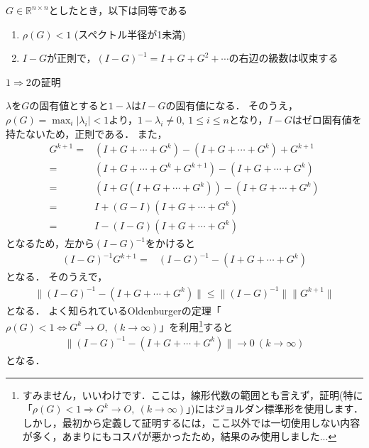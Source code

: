\begin{Thm}\label{thm:finite_Neumann}
	$G \in {\mathbb R}^{n \times n}$としたとき，以下は同等である
	\begin{enumerate}
		\item $\rho(G) < 1$ (スペクトル半径が1未満)
		\item $I - G$が正則で，$(I - G)^{-1} = I + G + G^2 + \cdots$の右辺の級数は収束する
	\end{enumerate}
\end{Thm}
\begin{Proof}
	\noindent $1 \Rightarrow 2$の証明

	$\lambda$を$G$の固有値とすると$1 - \lambda$は$I - G$の固有値になる．
	そのうえ，$\rho(G) = \max_{i} | \lambda_i | < 1$より，$1 - \lambda_i \neq 0, ~ 1 \le i \le n$となり，$I-G$はゼロ固有値を持たないため，正則である．
	また，
	\begin{align*}
		G^{k + 1} =& (I + G + \cdots + G^k) - (I + G + \cdots + G^k) + G^{k + 1} \\
		=& (I + G + \cdots + G^k + G^{k + 1}) - (I + G + \cdots + G^k) \\
		=& (I + G(I + G + \cdots + G^k)) - (I + G + \cdots + G^k) \\
		=& I + (G - I) (I + G + \cdots + G^k) \\
		=& I - (I - G)(I + G + \cdots + G^k)
	\end{align*}
	となるため，左から$(I - G)^{-1}$をかけると
	\begin{align*}
		(I - G)^{-1} G^{k + 1} =&  (I - G)^{-1} - (I + G + \cdots + G^k)
	\end{align*}
	となる．
	そのうえで，
	\begin{align*}
		\| (I - G)^{-1} - (I + G + \cdots + G^k) \| \le \| (I - G)^{-1} \| \| G^{k + 1} \|
	\end{align*}
	となる．
	よく知られているOldenburgerの定理「$\rho(G) < 1 \Leftrightarrow G^k \rightarrow O, ~ (k \rightarrow \infty)$」を利用\footnote{すみません，いいわけです．ここは，線形代数の範囲とも言えず，証明(特に「$\rho(G) < 1 \Rightarrow G^k \rightarrow O, ~ (k \rightarrow \infty)$」)にはジョルダン標準形を使用します．しかし，最初から定義して証明するには，ここ以外では一切使用しない内容が多く，あまりにもコスパが悪かったため，結果のみ使用しました...}すると
	\begin{align*}
		\| (I - G)^{-1} - (I + G + \cdots + G^k) \| \rightarrow 0 ~ (k \rightarrow \infty)
	\end{align*}
	となる．
	

\end{Proof}
